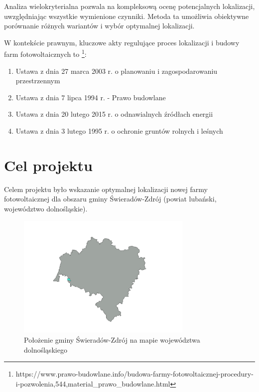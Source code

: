 \documentclass{article}
\begin{document}
Analiza wielokryterialna pozwala na kompleksową ocenę potencjalnych lokalizacji, uwzględniając wszystkie wymienione czynniki. Metoda ta umożliwia obiektywne porównanie różnych wariantów i wybór optymalnej lokalizacji.
\vspace{10pt}

W kontekście prawnym, kluczowe akty regulujące proces lokalizacji i budowy farm fotowoltaicznych to \footnote{https://www.prawo-budowlane.info/budowa-farmy-fotowoltaicznej-procedury-i-pozwolenia,544,material\_prawo\_budowlane.html}:

\begin{enumerate}[label=•]
    \item Ustawa z dnia 27 marca 2003 r. o planowaniu i zagospodarowaniu przestrzennym
    \item Ustawa z dnia 7 lipca 1994 r. - Prawo budowlane
    \item Ustawa z dnia 20 lutego 2015 r. o odnawialnych źródłach energii
    \item Ustawa z dnia 3 lutego 1995 r. o ochronie gruntów rolnych i leśnych
\end{enumerate}

\section{Cel projektu}

Celem projektu było wskazanie optymalnej lokalizacji nowej farmy fotowoltaicznej dla obszaru gminy Świeradów-Zdrój (powiat lubański, województwo dolnośląskie).

\begin{figure}[H]
    \centering
    \includegraphics[width=0.75\textwidth]{img/swieradow.png}
    \caption{Położenie gminy Świeradów-Zdrój na mapie województwa dolnośląskiego}
\end{figure}
\newpage
\end{document}
